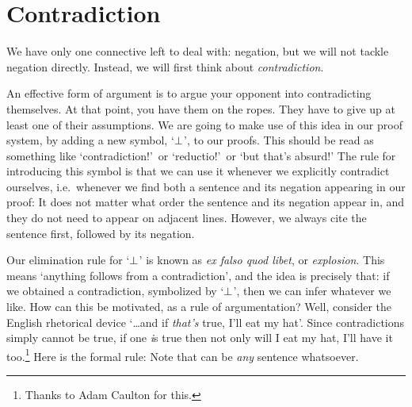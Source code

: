 \section{Contradiction}
We have only one connective left to deal with: negation, but we will not tackle negation directly. Instead, we will first think about \emph{contradiction}. 

An effective form of argument is to argue your opponent into contradicting themselves. At that point, you have them on the ropes. They have to give up at least one of their assumptions. We are going to make use of this idea in our proof system, by adding a new symbol, `$\bot$', to our proofs. This should be read as something like `contradiction!'\ or `reductio!'\ or `but that's absurd!'  The rule for introducing this symbol is that we can use it whenever we explicitly contradict ourselves, i.e.\ whenever we find both a sentence and its negation appearing in our proof:
It does not matter what order the sentence and its negation appear in, and they do not need to appear on adjacent lines. However, we always cite the sentence first, followed by its negation. 

Our elimination rule for `$\bot$' is known as \emph{ex falso quod libet}, or \emph{explosion}. This means `anything follows from a contradiction', and the idea is precisely that: if we obtained a contradiction, symbolized by `$\bot$', then we can infer whatever we like. How can this be motivated, as a rule of argumentation? Well, consider the English rhetorical device `\ldots and if \emph{that's} true, I'll eat my hat'. Since contradictions simply cannot be true, if one \emph{i}s true then not only will I eat my hat, I'll have it too.\footnote{Thanks to Adam Caulton for this.} Here is the formal rule:
Note that  can be \emph{any} sentence whatsoever. 

